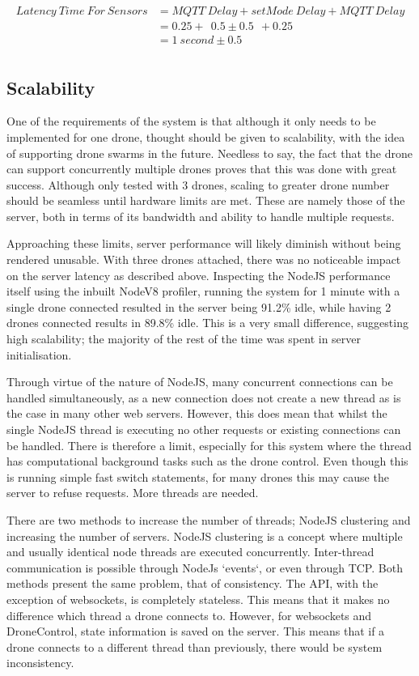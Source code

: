 \documentclass{article}
\begin{document}
\begin{equation*}
\begin{split}
Latency\ Time\ For\ Sensors & = MQTT\ Delay + setMode\ Delay + MQTT\ Delay \\
							& = 0.25 +\ \ 0.5 \pm 0.5 \ \ + 0.25 \\
							& = 1\ second \pm 0.5 \\
\end{split}
\end{equation*}

\subsection{Scalability}
One of the requirements of the system is that although it only needs to be implemented for one drone, thought should be given to scalability, with the idea of supporting drone swarms in the future. Needless to say, the fact that the drone can support concurrently multiple drones proves that this was done with great success. Although only tested with 3 drones, scaling to greater drone number should be seamless until hardware limits are met. These are namely those of the server, both in terms of its bandwidth and ability to handle multiple requests. 

Approaching these limits, server performance will likely diminish without being rendered unusable. With three drones attached, there was no noticeable impact on the server latency as described above. Inspecting the NodeJS performance itself using the inbuilt NodeV8 profiler, running the system for 1 minute with a single drone connected resulted in the server being 91.2\% idle, while having 2 drones connected results in 89.8\% idle. This is a very small difference, suggesting high scalability; the majority of the rest of the time was spent in server initialisation. 

Through virtue of the nature of NodeJS, many concurrent connections can be handled simultaneously, as a new connection does not create a new thread as is the case in many other web servers. However, this does mean that whilst the single NodeJS thread is executing no other requests or existing connections can be handled. There is therefore a limit, especially for this system where the thread has computational background tasks such as the drone control. Even though this is running simple fast switch statements, for many drones this may cause the server to refuse requests. More threads are needed.

There are two methods to increase the number of threads; NodeJS clustering and increasing the number of servers. NodeJS clustering is a concept where multiple and usually identical node threads are executed concurrently. Inter-thread communication is possible through NodeJs `events`, or even through TCP. Both methods present the same problem, that of consistency. The API, with the exception of websockets, is completely stateless. This means that it makes no difference which thread a drone connects to. However, for websockets and DroneControl, state information is saved on the server. This means that if a drone connects to a different thread than previously, there would be system inconsistency.
\end{document}
